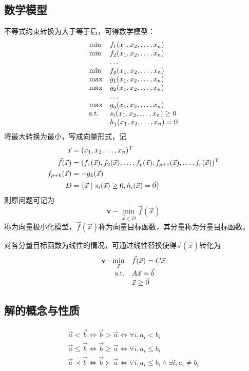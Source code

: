 \subsection{数学模型}
不等式约束转换为大于等于后，可得数学模型：
\[
    \begin{array}{ll}
        \min & f_1(\VectorComma{x}{n}) \\
        \min & f_2(\VectorComma{x}{n}) \\
        & \dots \\
        \min & f_p(\VectorComma{x}{n}) \\
        \max & g_1(\VectorComma{x}{n}) \\
        \max & g_2(\VectorComma{x}{n}) \\
        & \dots \\
        \max & g_q(\VectorComma{x}{n}) \\
        \SubjectTo & s_i(\VectorComma{x}{n})\geq 0 \\
        & h_j(\VectorComma{x}{n}) = 0 \\
    \end{array}
\]
将最大转换为最小，写成向量形式，记
\[
    \begin{split}
        \vec{x} &= (\VectorComma{x}{n})\Transpose \\
        \vec{f}(\vec{x}) & =(f_1(\vec{x}),f_2(\vec{x}),\dots,f_p(\vec{x}),f_{p+1}(\vec{x}),\dots,f_r(\vec{x}))\Transpose \\
        f_{p+k}(\vec{x}) & = -g_{k}(\vec{x}) \\
        D &= \{\vec{x}\mid s_i(\vec{x})\geq 0,h_i(\vec{x}) = \vec{0}\} \\
    \end{split}
\]
则原问题可记为
\[
    \mathbf{v-}\min_{\vec{x}\in D} \vec{f}(\vec{x})
\]
称为向量极小化模型，$\vec{f}(\vec{x})$称为向量目标函数，其分量称为分量目标函数。

对各分量目标函数为线性的情况，可通过线性替换使得$\vec{s}(\vec{x})$转化为
\[
    \begin{array}{rl}
        \mathbf{v-}\min\limits_{\vec{x}} & \vec{f}(\vec{x}) = C\vec{x} \\
        \mathrm{s.t.} & A\vec{x} = \vec{b} \\
        & \vec{x} \geq \vec{0} \\
    \end{array}
\]

\subsection{解的概念与性质}
\begin{definition}[向量的序关系]
    \begin{gather*}
        \vec{a} < \vec{b} \Leftrightarrow \vec{b} > \vec{a} \Leftrightarrow \forall i,a_i<b_i \\
        \vec{a} \leq \vec{b} \Leftrightarrow \vec{b} \geq \vec{a} \Leftrightarrow \forall i,a_i\leq b_i \\
        \vec{a} \prec \vec{b} \Leftrightarrow \vec{b} \succ \vec{a} \Leftrightarrow \forall i, a_i\leq b_i \land \exists i, a_i\neq b_i\\
    \end{gather*}
\end{definition}

